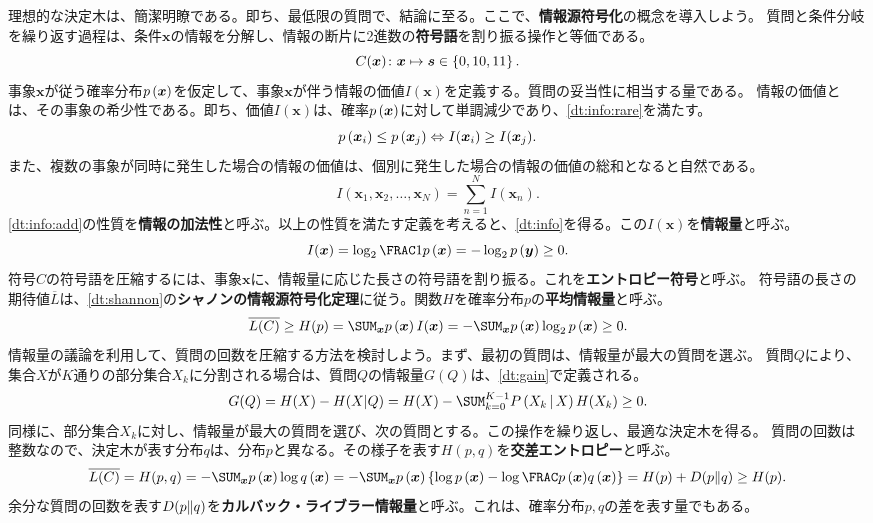\documentclass[10pt,a4paper]{book}
\begin{document}
理想的な決定木は、簡潔明瞭である。即ち、最低限の質問で、結論に至る。ここで、\textbf{情報源符号化}の概念を導入しよう。
質問と条件分岐を繰り返す過程は、条件$\bm{x}$の情報を分解し、情報の断片に2進数の\textbf{符号語}を割り振る操作と等価である。
%
\begin{equation}
C(\bm{x}) \colon \bm{x} \mapsto \bm{s} \in \seq{0, 10, 11}.
\end{equation}
%
事象$\bm{x}$が従う確率分布$\prob{\bm{x}}$を仮定して、事象$\bm{x}$が伴う情報の価値$I(\bm{x})$を定義する。質問の妥当性に相当する量である。
情報の価値とは、その事象の希少性である。即ち、価値$I(\bm{x})$は、確率$\prob{\bm{x}}$に対して単調減少であり、\eqref{dt:info:rare}を満たす。
%
\begin{equation}
\label{eq:dt:info:rare}
\prob{\bm{x}_i} \leq \prob{\bm{x}_j} \Leftrightarrow I(\bm{x}_i) \geq I(\bm{x}_j).
\end{equation}
%
また、複数の事象が同時に発生した場合の情報の価値は、個別に発生した場合の情報の価値の総和となると自然である。
%
\begin{equation}
\label{eq:dt:info:add}
I(\bm{x}_1,\bm{x}_2,\ldots,\bm{x}_N) = \sum_{n=1}^N I(\bm{x}_n).
\end{equation}
%
\eqref{dt:info:add}の性質を\textbf{情報の加法性}と呼ぶ。以上の性質を満たす定義を考えると、\eqref{dt:info}を得る。この$I(\bm{x})$を\textbf{情報量}と呼ぶ。
%
\begin{equation}
\label{eq:dt:info}
I(\bm{x}) = \log_2 \frac{1}{\prob{\bm{x}}} = - \log_2 \prob{\bm{y}} \geq 0.
\end{equation}
%
符号$C$の符号語を圧縮するには、事象$\bm{x}$に、情報量に応じた長さの符号語を割り振る。これを\textbf{エントロピー符号}と呼ぶ。
符号語の長さの期待値$\overline{L}$は、\eqref{dt:shannon}の\textbf{シャノンの情報源符号化定理}に従う。関数$H$を確率分布$p$の\textbf{平均情報量}と呼ぶ。
%
\begin{equation}
\label{eq:dt:shannon}
\overline{L(C)} \geq H(p) = \sum_{\bm{x}} \prob{\bm{x}} I(\bm{x}) = -\sum_{\bm{x}} \prob{\bm{x}} \log_2 \prob{\bm{x}} \geq 0.
\end{equation}
%
情報量の議論を利用して、質問の回数を圧縮する方法を検討しよう。まず、最初の質問は、情報量が最大の質問を選ぶ。
質問$Q$により、集合$X$が$K$通りの部分集合$X_k$に分割される場合は、質問$Q$の情報量$G(Q)$は、\eqref{dt:gain}で定義される。
%
\begin{equation}
\label{eq:dt:gain}
G(Q) = H(X) - H(X|Q) = H(X) - \sum_{k=0}^{K-1} \Prob{X_k}[X] H(X_k) \geq 0.
\end{equation}
%
同様に、部分集合$X_k$に対し、情報量が最大の質問を選び、次の質問とする。この操作を繰り返し、最適な決定木を得る。
質問の回数は整数なので、決定木が表す分布$q$は、分布$p$と異なる。その様子を表す$H(p,q)$を\textbf{交差エントロピー}と呼ぶ。
%
\begin{equation}
\label{eq:dt:KL}
\overline{L(C)} = H(p,q) =
-\sum_{\bm{x}} \prob{\bm{x}} \log \qrob{\bm{x}} =
-\sum_{\bm{x}} \prob{\bm{x}} \left\{\log \prob{\bm{x}} - \log\frac{\prob{\bm{x}}}{\qrob{\bm{x}}}\right\} =
H(p) + \KL{p}{q} \geq H(p).
\end{equation}
%
余分な質問の回数を表す$D\!\left(p\|q\right)$を\textbf{カルバック・ライブラー情報量}と呼ぶ。これは、確率分布$p,q$の差を表す量でもある。
\end{document}
